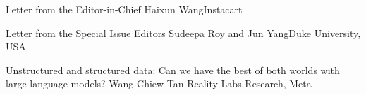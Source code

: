 \documentclass[11pt]{article}
\begin{document}


\begin{bulletin}


%
%

\begin{lettersection}


\begin{letter}{Letter from the Editor-in-Chief}
{Haixun Wang}{Instacart}

\end{letter}
%
\newpage
%
%
\begin{letter}{Letter from the Special Issue Editors} 
{Sudeepa Roy and Jun Yang}{Duke University, USA}


\end{letter}


\end{lettersection}

\begin{opinionsection}
\begin{opinion}{Unstructured and structured data: Can we have the best of both worlds with large language models?}
  {Wang-Chiew Tan}
  {Reality Labs Research, Meta}

\end{opinion}
\end{opinionsection}


\end{bulletin}
\end{document}
